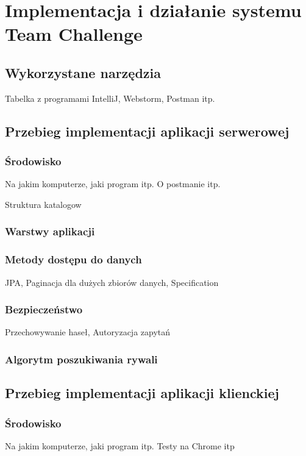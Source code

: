 \chapter{Implementacja i działanie systemu Team Challenge}

\section{Wykorzystane narzędzia}

Tabelka z programami IntelliJ, Webstorm, Postman itp.

\section{Przebieg implementacji aplikacji serwerowej}

\subsection{Środowisko}

Na jakim komputerze, jaki program itp. O postmanie itp.


Struktura katalogow 

\subsection{Warstwy aplikacji}

\subsection{Metody dostępu do danych}

JPA, Paginacja dla dużych zbiorów danych, Specification

\subsection{Bezpieczeństwo}

Przechowywanie haseł, Autoryzacja zapytań

\subsection{Algorytm poszukiwania rywali}

\section{Przebieg implementacji aplikacji klienckiej}

\subsection{Środowisko}

Na jakim komputerze, jaki program itp. Testy na Chrome itp
